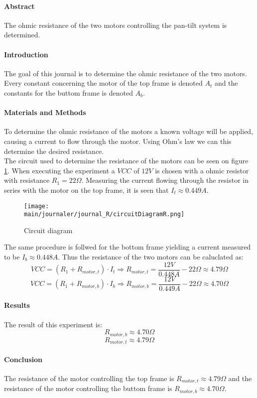 \documentclass[../../main]{subfiles}
\begin{document}
\paragraph{Abstract}
The ohmic resistance of the two motors controlling the pan-tilt system is determined.
\paragraph{Introduction}
The goal of this journal is to determine the ohmic resistance of the two motors. Every constant concerning the motor of the top frame is denoted $A_t$ and the constants for the buttom frame is denoted $A_b$.
\paragraph{Materials and Methods}
To determine the ohmic resistance of the motors a known voltage will be applied, causing a current to flow through the motor. Using Ohm's law we can this determine the desired resistance.\\
The circuit used to determine the resistance of the motors can be seen on figure \ref{fig:resistance_circuit}. When executing the experiment a $VCC$ of $12V$ is chosen with a ohmic resistor with resistance $R_1 = 22\Omega$. Measuring the current flowing through the resistor in series with the motor on the top frame, it is seen that $I_t \approx 0.449 A$.

\begin{figure}[H]
  \begin{center}
    \texttt{[image: \\main/journaler/journal\_R/circuitDiagramR.png]}
  \end{center}
  \caption{Circuit diagram}
  \label{fig:resistance_circuit}
\end{figure}

The same procedure is follwed for the bottom frame yielding a current measured to be $I_b \approx 0.448 A$. Thus the resistance of the two motors can be caluclated as:
$$VCC = (R_1 + R_{motor,t})\cdot I_t \Rightarrow R_{motor,t} = \frac{12V}{0.448 A}-22\Omega \approx 4.79 \Omega $$
$$VCC = (R_1 + R_{motor,b})\cdot I_b \Rightarrow R_{motor,b} = \frac{12V}{0.449 A}-22\Omega \approx 4.70 \Omega $$


\paragraph{Results}

The result of this experiment is:
$$R_{motor,b} \approx 4.70 \Omega$$
$$R_{motor,t} \approx 4.79 \Omega$$



\paragraph{Conclusion}

The resistance of the motor controlling the top frame is $R_{motor,t}\approx 4.79 \Omega$ and the resistance of the motor controlling the buttom frame is $R_{motor,b}\approx 4.70 \Omega$.
\end{document}
